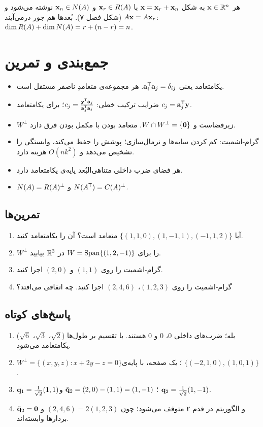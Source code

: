 \begin{intuition}
هر $\mathbf{x}\in\mathbb{R}^n$ به شکل $\mathbf{x}=\mathbf{x}_r+\mathbf{x}_n$ با $\mathbf{x}_r\in R(A)$ و $\mathbf{x}_n\in N(A)$ نوشته می‌شود و $A\mathbf{x}=A\mathbf{x}_r$ (شکل فصل ۷). بُعدها  هم جور درمی‌آیند: $\dim R(A)+\dim N(A)=r+(n-r)=n$.
\end{intuition}

\section{جمع‌بندی و تمرین}

\begin{summary}
\begin{itemize}
  \item یکامتعامد یعنی $\mathbf{a}_i^{\mathsf{T}}\mathbf{a}_j=\delta_{ij}$. هر مجموعه‌ی متعامدِ ناصفر مستقل است.
  \item ضرایب ترکیب خطی: $c_j=\frac{\mathbf{y}^{\mathsf{T}}\mathbf{a}_j}{\mathbf{a}_j^{\mathsf{T}}\mathbf{a}_j}$؛ برای یکامتعامد $c_j=\mathbf{a}_j^{\mathsf{T}}\mathbf{y}$.
  \item $W^\perp$ زیرفضاست و $W\cap W^\perp=\{\mathbf{0}\}$. متعامد بودن با مکمل بودن فرق دارد.
  \item گرام-اشمیت: کم کردن سایه‌ها و نرمال‌سازی؛ پوشش را حفظ می‌کند، وابستگی را تشخیص می‌دهد و $O(nk^2)$ هزینه دارد.
  \item هر فضای ضرب داخلی متناهی‌البُعد پایه‌ی یکامتعامد دارد.
  \item $N(A)=R(A)^\perp$ و $N(A^{\mathsf{T}})=C(A)^\perp$.
\end{itemize}
\end{summary}

\subsection*{تمرین‌ها}
\begin{enumerate}
  \item آیا $\{(1,1,0),(1,-1,1),(-1,1,2)\}$ متعامد است؟ آن را یکامتعامد کنید.
  \item $W^\perp$ را برای $W=\operatorname{Span}\{(1,2,-1)\}$ در $\mathbb{R}^3$ بیابید.
  \item گرام-اشمیت را روی $(1,1)$ و $(2,0)$ اجرا کنید.
  \item گرام-اشمیت را روی $(1,2,3)$، $(2,4,6)$ اجرا کنید. چه اتفاقی می‌افتد؟
\end{enumerate}

\subsection*{پاسخ‌های کوتاه}
\begin{enumerate}
  \item بله؛ ضرب‌های داخلی $0$، $0$ و $0$ هستند. با تقسیم بر طول‌ها ($\sqrt2$، $\sqrt3$، $\sqrt6$) یکامتعامد می‌شود.
  \item $W^\perp=\{(x,y,z): x+2y-z=0\}$؛ یک صفحه، با پایه‌ی $\{(-2,1,0),(1,0,1)\}$.
  \item $\mathbf{q}_1=\frac1{\sqrt2}(1,1)$؛ $\tilde{\mathbf{q}}_2=(2,0)-(1,1)=(1,-1)$ و $\mathbf{q}_2=\frac1{\sqrt2}(1,-1)$.
  \item $\tilde{\mathbf{q}}_2=\mathbf{0}$ و الگوریتم در قدم ۲ متوقف می‌شود؛ چون $(2,4,6)=2(1,2,3)$ و بردارها وابسته‌اند.
\end{enumerate}
